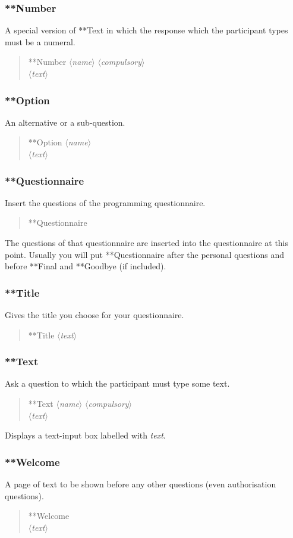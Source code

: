 \documentclass[11pt,a4paper]{article}
\newcommand{\phr}[1]{$\langle$\emph{#1}$\rangle$}
\newcommand{\seclabel}[1]{\label{sec:#1}}
\begin{document}
\subsubsection{**Number}
A special version of **Text in which the response which the participant types must be a numeral.
\begin{quote}
**Number \phr{name} \phr{compulsory} \\
\phr{text}
\end{quote}

\subsubsection{**Option}
An alternative or a sub-question.
\begin{quote}
**Option \phr{name} \\
\phr{text} 
\end{quote}

\subsubsection{**Questionnaire}
\seclabel{questionnairequestionnaire}
Insert the questions of the programming questionnaire.
\begin{quote}
**Questionnaire
\end{quote}
The questions of that questionnaire are inserted into the questionnaire at this point. Usually you will put **Questionnaire after the personal questions and before **Final and **Goodbye (if included).

\subsubsection{**Title}
Gives the title you choose for your questionnaire. 
\begin{quote}
**Title \phr{text}
\end{quote}

\subsubsection{**Text}

Ask a question to which the participant must type some text.
\begin{quote}
**Text \phr{name} \phr{compulsory} \\
\phr{text}
\end{quote}
Displays a text-input box labelled with \emph{text}.

\subsubsection{**Welcome}
A page of text to be shown before any other questions (even authorisation questions). 
\begin{quote}
**Welcome \\
\phr{text}
\end{quote}
\end{document}
